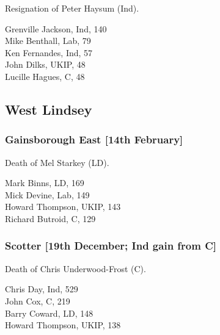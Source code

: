 \documentclass[a4paper,openany,10pt]{book}
\begin{document}
Resignation of Peter Haysum (Ind).



Grenville Jackson, Ind, 140\\
Mike Benthall, Lab, 79\\
Ken Fernandes, Ind, 57\\
John Dilks, UKIP, 48\\
Lucille Hagues, C, 48\\


\subsection*{West Lindsey}

\subsubsection*{Gainsborough East \hspace*{\fill}\nolinebreak[1]%
\enspace\hspace*{\fill}
[14th February]}


Death of Mel Starkey (LD).



Mark Binns, LD, 169\\
Mick Devine, Lab, 149\\
Howard Thompson, UKIP, 143\\
Richard Butroid, C, 129\\


\subsubsection*{Scotter \hspace*{\fill}\nolinebreak[1]%
\enspace\hspace*{\fill}
[19th December; Ind gain from C]}


Death of Chris Underwood-Frost (C).



Chris Day, Ind, 529\\
John Cox, C, 219\\
Barry Coward, LD, 148\\
Howard Thompson, UKIP, 138\\


\vfill
\end{document}
